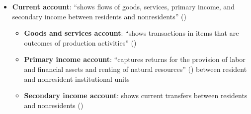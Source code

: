 \documentclass[
  ignorenonframetext,
]{beamer}
\begin{document}
\begin{frame}{}
\label{section-5}
\begin{itemize}
\item
  \textbf{Current account}: ``shows flows of goods, services, primary
  income, and secondary income between residents and nonresidents''
  ()

  \begin{itemize}
  \item
    \textbf{Goods and services account}: ``shows transactions in items
    that are outcomes of production activities''
    ()
  \item
    \textbf{Primary income account}: ``captures returns for the
    provision of labor and financial assets and renting of natural
    resources''
    () between resident and nonresident institutional units
  \item
    \textbf{Secondary income account}: shows current transfers between
    residents and nonresidents
    ()
  \end{itemize}
\end{itemize}
\end{frame}
\end{document}
